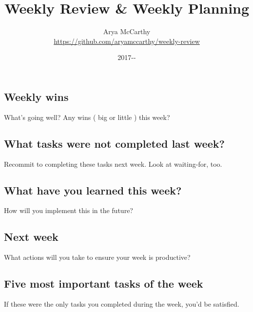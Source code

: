 \documentclass[11pt, oneside, twocolumn]{article}   	%
\title{Weekly Review \& Weekly Planning}
\author{\vspace{-3em}Arya McCarthy\\%
\url{https://github.com/aryamccarthy/weekly-review}}
\date{2017-\underline{\hspace{2ex}}-\underline{\hspace{2ex}}}							%
\begin{document}
\maketitle
\subsection*{Weekly wins}
\vspace{-0.9em}
{\footnotesize What's going well? Any wins ( big or little ) this week?}

\hrulefill

\hrulefill

\hrulefill

\hrulefill

\subsection*{What tasks were not completed last week?}
\vspace{-0.9em}
{\footnotesize Recommit to completing these tasks next week. Look at waiting-for, too.}

\hrulefill

\hrulefill

\hrulefill

\hrulefill

\hrulefill

\hrulefill


\subsection*{What have you learned this week?}
\vspace{-0.9em}
{\footnotesize How will you implement this in the future?}

\hrulefill

\hrulefill

\hrulefill


\subsection*{Next week}
\vspace{-0.9em}
{\footnotesize What actions will you take to ensure your week is productive?}

\hrulefill

\hrulefill

\hrulefill

\newpage

\subsection*{Five most important tasks of the week}
\vspace{-0.9em}
{\footnotesize If these were the only tasks you completed during the week, you'd be satisfied.}
\end{document}
